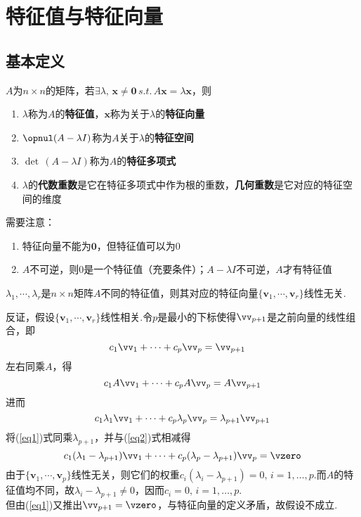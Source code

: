 
\section{特征值与特征向量}
\subsection{基本定义}
\begin{definition}$A$为$n\times n$的矩阵，若$\exists\lambda,\,\mathbf{x}\ne\mathbf{0}\,s.t.\,A\mathbf{x}=\lambda\mathbf{x}$，则
\begin{enumerate}
	\itemsep -2pt
	\item $\lambda$称为$A$的\textbf{特征值}，$\mathbf{x}$称为关于$\lambda$的\textbf{特征向量}
	\item $\opnul (A-\lambda I)$称为$A$关于$\lambda$的\textbf{特征空间}
	\item $\det\,(A-\lambda I)$称为$A$的\textbf{特征多项式}
	\item $\lambda$的\textbf{代数重数}是它在特征多项式中作为根的重数，\textbf{几何重数}是它对应的特征空间的维度
\end{enumerate}
\end{definition}
需要注意：
\begin{enumerate}
	\itemsep -3pt
	\item 特征向量不能为$\mathbf{0}$，但特征值可以为$0$
	\item $A$不可逆，则$0$是一个特征值（充要条件）；$A-\lambda I$不可逆，$A$才有特征值
\end{enumerate}
\begin{theorem}
\label{distinct_lambda}
$\lambda_1,\cdots,\lambda_r$是$n\times n$矩阵$A$不同的特征值，则其对应的特征向量$\{\mathbf{v}_1,\cdots,\mathbf{v}_r\}$线性无关.
\end{theorem}
\begin{analysis}
反证，假设$\{\mathbf{v}_1,\cdots,\mathbf{v}_r\}$线性相关.令$p$是最小的下标使得$\vv_{p+1}$是之前向量的线性组合，即
\begin{equation}\label{eq1} c_1\vv_1+\cdots+c_p\vv_p=\vv_{p+1}\quad\end{equation}
左右同乘$A$，得
\[c_1A\vv_1+\cdots+c_pA\vv_p=A\vv_{p+1}\]
进而
\begin{equation}\label{eq2} c_1\lambda_1\vv_1+\cdots+c_p\lambda_p\vv_p=\lambda_{p+1}\vv_{p+1}\end{equation}
将(\ref{eq1})式同乘$\lambda_{p+1}$，并与(\ref{eq2})式相减得
\[c_1(\lambda_1-\lambda_{p+1})\vv_1+\cdots+c_p(\lambda_p-\lambda_{p+1})\vv_p=\vzero\]
由于$\{\mathbf{v}_1,\cdots,\mathbf{v}_p\}$线性无关，则它们的权重$c_i(\lambda_i-\lambda_{p+1})=0,\,i=1,\dots,p$.而$A$的特征值均不同，故$\lambda_i-\lambda_{p+1}\ne 0$，因而$c_i=0,\,i=1,\dots,p$.\\
但由(\ref{eq1})又推出$\vv_{p+1}=\vzero$，与特征向量的定义矛盾，故假设不成立.
\end{analysis}
